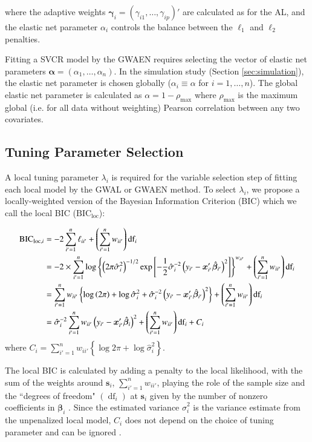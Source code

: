 \documentclass[authoryear, review, 11pt]{elsarticle}
\DeclareMathOperator*{\df}{\mbox{df}}
\begin{document}
	where the adaptive weights $\bm{\gamma}_i = \left(\gamma_{i1}, \dots, \gamma_{ip}\right)'$ are calculated as for the AL, and the elastic net parameter $\alpha_i$ controls the balance between the $\ell_1$ and $\ell_2$ penalties.
	
	Fitting a SVCR model by the GWAEN requires selecting the vector of elastic net parameters $\bm{\alpha} = \left( \alpha_1, \dots, \alpha_n \right)$. In the simulation study (Section \ref{sec:simulation}), the elastic net parameter is chosen globally ($\alpha_i \equiv \alpha$ for $i=1, \dots, n$). The global elastic net parameter is calculated as $\alpha = 1-\rho_{\text{max}}$ where $\rho_{\text{max}}$ is the maximum global (i.e. for all data without weighting) Pearson correlation between any two covariates.

	\subsection{Tuning Parameter Selection}	
	A local tuning parameter $\lambda_i$ is required for the variable selection step of fitting each local model by the GWAL or GWAEN method. To select $\lambda_i$, we propose a locally-weighted version of the Bayesian Information Criterion (BIC) \citep{Schwarz-1978} which we call the local BIC ($\text{BIC}_{\text{loc}}$):
	
	\begin{align}
		\mbox{BIC}_{\text{loc}, i} &= -2 \sum_{i'=1}^n \ell_{ii'}  + \left( \sum_{i'=1}^n w_{ii'} \right) \mbox{df}_i\notag\\
		&= -2 \times \sum_{i'=1}^n \log \left\{ \left(2 \pi \hat{\sigma}_i^2\right)^{-1/2} \exp \left[-\frac{1}{2} \hat{\sigma}_i^{-2} \left(y_{i'} - \bm{x}_{i'}' \hat{\bm{\beta}}_{i'} \right)^2\right] \right\}^{w_{ii'}} + \left( \sum_{i'=1}^n w_{ii'} \right) \mbox{df}_i\notag\\
		&= \sum_{i'=1}^n w_{ii'} \left\{ \log \left(2 \pi \right) + \log \hat{\sigma}_i^2 + \hat{\sigma}_i^{-2} \left(y_{i'} - \bm{x}_{i'}' \hat{\bm{\beta}}_{i'} \right)^2 \right\} + \left( \sum_{i'=1}^n w_{ii'} \right) \mbox{df}_i \notag\\
		&= \hat{\sigma}_i^{-2} \sum_{i'=1}^n w_{ii'} \left( y_{i'} - \bm{x}'_{i'} \hat{\bm{\beta}}_i \right)^2 + \left( \sum_{i'=1}^n w_{ii'} \right) \mbox{df}_i + C_i
	\end{align}
	where $C_i = \sum \limits_{i'=1}^n w_{ii'} \left\{\log{2\pi} + \log{\hat{\sigma}_i^2} \right\}$.
	
	 The local BIC is calculated by adding a penalty to the local likelihood, with the sum of the weights around $\bm{s}_i$, $\sum_{i'=1}^n w_{ii'}$, playing the role of the sample size and the ``degrees of freedom" $\left( \df_i \right)$ at $\bm{s}_i$ given by the number of nonzero coefficients in $\bm{\beta}_i$ \citep{Zou:2007}. Since the estimated variance $\hat{\sigma}_i^2$ is the variance estimate from the unpenalized local model, $C_i$ does not depend on the choice of tuning parameter and can be ignored \citep{Zou:2007}.
	
\end{document}
